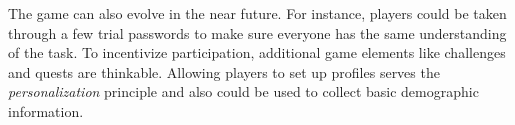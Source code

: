 The game can also evolve in the near future. For instance, players could be taken through a few trial passwords to make sure everyone has the same understanding of the task. To incentivize participation, additional game elements like challenges and quests are thinkable. Allowing players to set up profiles serves the \textit{personalization} principle and also could be used to collect basic demographic information. 

\vspace*{2cm}\noindent
{}